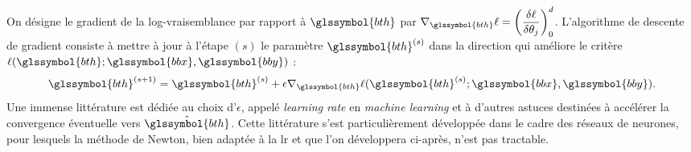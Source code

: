 On désigne le gradient de la log-vraisemblance par rapport à $\glssymbol{bth}$ par $\nabla_{\glssymbol{bth}} \ell = \left( \dfrac{\delta \ell}{\delta \theta_j} \right)_0^d$. L'algorithme de descente de gradient consiste à mettre à jour à l'étape $(s)$ le paramètre $\glssymbol{bth}^{(s)}$ dans la direction qui améliore le critère $\ell(\glssymbol{bth};\glssymbol{bbx},\glssymbol{bby})$ : $$\glssymbol{bth}^{(s+1)} = \glssymbol{bth}^{(s)} + \epsilon \nabla_{\glssymbol{bth}} \ell(\glssymbol{bth}^{(s)};\glssymbol{bbx},\glssymbol{bby}).$$ Une immense littérature est dédiée au choix d'$\epsilon$, appelé \textit{learning rate} en \textit{machine learning} et à d'autres astuces destinées à accélérer la convergence éventuelle vers $\hat{\glssymbol{bth}}$. Cette littérature s'est particulièrement développée dans le cadre des réseaux de neurones, pour lesquels la méthode de Newton, bien adaptée à la \gls{lr} et que l'on développera ci-après, n'est pas tractable.

